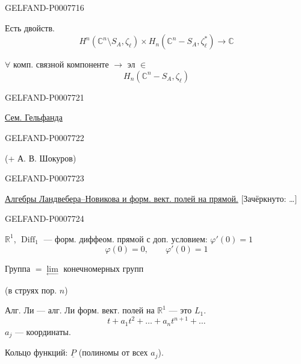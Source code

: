 \begin{GelfandAdjacentEvidence}{GELFAND-P000771}{6}


Есть двойств.
\[
H^n(\mathbb C^n\setminus S_A,\zeta_\ell)\times
H_n(\mathbb C^n-S_A,\zeta_\ell^*)\longrightarrow\mathbb C
\]

\(\forall\) комп. связной компоненте \(\longrightarrow\) эл \(\in\)
\[
H_n(\mathbb C^n-S_A,\zeta_\ell)
\]
\end{GelfandAdjacentEvidence}



\begin{GelfandAdjacentEvidence}{GELFAND-P000772}{1}

\qquad\underline{Сем. Гельфанда}

\end{GelfandAdjacentEvidence}
\begin{GelfandAdjacentEvidence}{GELFAND-P000772}{2}


(+ А. В. Шокуров)
\end{GelfandAdjacentEvidence}
\begin{GelfandAdjacentEvidence}{GELFAND-P000772}{3}


\underline{Алгебры Ландвебера--Новикова и форм. вект. полей на прямой.}
[Зачёркнуто: …]
\end{GelfandAdjacentEvidence}
\begin{GelfandAdjacentEvidence}{GELFAND-P000772}{4}


\(\mathbb R^1\), \(\operatorname{Diff}_1\) --- форм. диффеом. прямой с доп. условием: \(\varphi'(0)=1\)
\[
\varphi(0)=0,\qquad\varphi'(0)=1
\]

Группа \(=\underset{\longleftarrow}{\lim}\) конечномерных групп

(в струях пор. \(n\))

Алг. Ли --- алг. Ли форм. вект. полей на \(\mathbb R^1\) --- это \(L_1\).
\[
t+a_1t^2+\ldots+a_nt^{n+1}+\ldots
\]
\(a_j\) --- координаты.

Кольцо функций: \(\underline P\) (полиномы от всех \(a_j\)).
\end{GelfandAdjacentEvidence}

